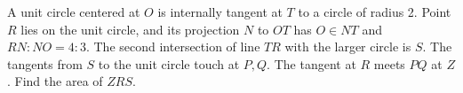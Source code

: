 A unit circle centered at $ O $ is internally tangent at $ T $ to a circle of radius 2. Point $ R $ lies on the unit circle, and its projection $ N $ to $ OT $ has $ O\in NT $ and $ RN:NO=4:3 $. The second intersection of line $ TR $ with the larger circle is $ S $. The tangents from $ S $ to the unit circle touch at $ P,Q $. The tangent at $ R $ meets $ PQ $ at $ Z $. Find the area of $ ZRS $.
